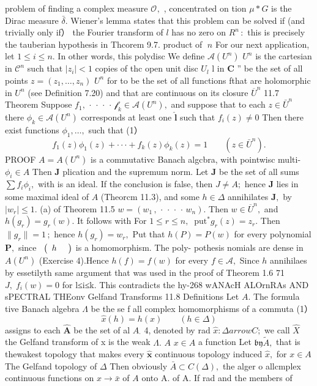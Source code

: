 problem of finding a complex measure ${\mathcal{O}}_{},$ , concentrated on tion $\textstyle\mu*G$ is the Dirac measure ${\bar{\delta}}.$ Wiener's lemma states that this problem can be solved if (and trivially only if） the Fourier transform of $\boldsymbol{\mathit{l}}$ has no zero on $\scriptstyle R^{n}\,\mathrm{:}$ this is precisely the tauberian hypothesis in Thcorem 9.7. product of $\;n$ For our next application, let $1\leq i\leq n.$ In other words, this polydisc We define ${\mathcal{A}}(U^{n})$ $U^{n}$ is the cartesian in ${\mathcal{C}}^{n}$ such that $|z_{i}|<1$ copies of thc open unit disc $U_{\mathit{l}}$ l in ${\boldsymbol{C}}$ ” be the set of all points $z=(z_{1},\ldots,z_{n})$ $U^{n}$ for to be the set of all functions fthat are holomorphic in $U^{n}$ (see Definition 7.20) and that are continuous on its closure ${\overline{{U}}}^{n}$ 11.7 Theorem Suppose $f_{1},\,\cdot\,\cdot\,\cdot\,\cdot\,\mathcal{f}_{k}\in\mathcal{A}(U^{n})\mathcal{,}$ and suppose that to each $z\in{\bar{U}}^{n}$ there $\phi_{k}\in{\mathcal{A}}(U^{n})$ corresponds at least one $\hat{\boldsymbol{l}}$ such that $f_{i}(z)\neq0$ Then there exist functions $\phi_{1},\ldots,$ such that (1） $$ f_{1}(z)\phi_{1}(z)+\cdot\cdot\cdot+f_{k}(z)\phi_{k}(z)=1\;\;\;\;\;\;\;(z\in\bar{U}^{n}). $$ PROOF $A=A(U^{n})$ is a commutativc Banach algcbra, with pointwisc multi- $\phi_{i}\in A$ Then $\boldsymbol{J}$ plication and the supremum norm. Let $\boldsymbol{J}$ be the set of all sums $\textstyle\sum f_{i}\phi_{i},$ with is an ideal. If the conclusion is false, then $J\neq A;$ hence $\boldsymbol{J}$ lies in some maximal ideal of $\textstyle A$ (Theorcm 11.3), and some $h\in\Delta$ annihilates ${\boldsymbol{J}},$ by $\left|w_{r}\right|\leq1.$ (a) of Theorem 11.5 $w=(w_{1}\,,\,\cdot\,\cdot\,\cdot\,\cdot\,w_{n}).$ Then $w\in{\overline{{U}}}^{n},$ and $h(g_{r})=g_{r}(w).$ It follows with For $1\leq r\leq n,\;\;\mathrm{put}^{*}g_{r}(z)=z_{r}.$ Then $\|g_{r}\|=1\,;$ hence $h(g_{r})=w_{r},$ Put that $h(P)=P(w)$ for every polynomial ${\boldsymbol{P}},$ since $\ \ \!\left(\begin{array}{l l}{h\!}&{}\end{array}\right)$ is a homomorphism. The poly- pothesis nomials are dense in ${\mathit{A}}(U^{n})$ (Exercise 4).Hence $h(f)=f(w)$ for every $f\in{\mathcal{A}},$ Since $\boldsymbol{\mathit{h}}$ annihilaes by essetilyth same argument that was used in the proof of Theorem 1.6 71 $J,\;f_{i}(w)=0$ for l≤i≤k. This contradicts the hy-268 wANAcH ALOrnRAs AND sPECTRAL THEonv Gelfand Transforms 11.8 Definitions Let $A.$ The formula tive Banach algebra $\Lambda$ be the se f all complex homomorphisms of a commuta (1） $$ \hat{x}(h)=h(x)\qquad(h\in\Delta) $$ assigns to each $\hat{\mathbf{A}}$ be the set of al $A_{\cdot}$ 4, denoted by rad ${\hat{x}}\colon\Delta arrow C;$ we call $\hat{X}$ the Gelfand transform of x is the weak $\Lambda.$ $\textstyle A$ $x\in A$ a function Let ${\mathfrak{b y}}{\tilde{A}},$ that is thewakest topology that makes every $\hat{\mathbf{x}}$ continuous topology induced ${\hat{x}},$ for $x\in A$ The Gelfand topology of $\Delta$ Then obviously ${\bar{A}}\subset C(\Delta),$ the alger o allcmplex continuous functions on $x\to{\bar{x}}$ of $\scriptstyle A$ onto A. of A. If rad and the members of 